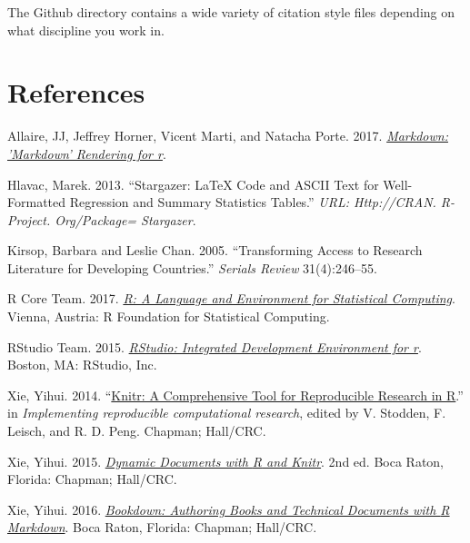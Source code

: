 \documentclass[
  12pt,
]{article}
\newlength{\cslhangindent}
\newlength{\cslentryspacingunit} %
\newenvironment{CSLReferences}[2] %
 {%
  \setlength{\parindent}{0pt}
  \ifodd #1
  \let\oldpar\par
  \def\par{\hangindent=\cslhangindent\oldpar}
  \fi
  \setlength{\parskip}{#2\cslentryspacingunit}
 }%
 {}
\begin{document}
The Github directory contains a wide variety of citation style files depending on what discipline you work in.

\hypertarget{references}{%
\section{References}\label{references}}

\linespread{1}

\hypertarget{refs}{}
\begin{CSLReferences}{1}{0}
\leavevmode{}%
Allaire, JJ, Jeffrey Horner, Vicent Marti, and Natacha Porte. 2017. \emph{\href{https://CRAN.R-project.org/package=markdown}{Markdown: 'Markdown' Rendering for r}}.

\leavevmode{}%
Hlavac, Marek. 2013. {``Stargazer: LaTeX Code and ASCII Text for Well-Formatted Regression and Summary Statistics Tables.''} \emph{URL: Http://CRAN. R-Project. Org/Package= Stargazer}.

\leavevmode{}%
Kirsop, Barbara and Leslie Chan. 2005. {``Transforming Access to Research Literature for Developing Countries.''} \emph{Serials Review} 31(4):246--55.

\leavevmode{}%
R Core Team. 2017. \emph{\href{https://www.R-project.org/}{R: A Language and Environment for Statistical Computing}}. Vienna, Austria: R Foundation for Statistical Computing.

\leavevmode{}%
RStudio Team. 2015. \emph{\href{http://www.rstudio.com/}{RStudio: Integrated Development Environment for r}}. Boston, MA: RStudio, Inc.

\leavevmode{}%
Xie, Yihui. 2014. {``\href{http://www.crcpress.com/product/isbn/9781466561595}{Knitr: A Comprehensive Tool for Reproducible Research in {R}}.''} in \emph{Implementing reproducible computational research}, edited by V. Stodden, F. Leisch, and R. D. Peng. Chapman; Hall/CRC.

\leavevmode{}%
Xie, Yihui. 2015. \emph{\href{https://yihui.name/knitr/}{Dynamic Documents with {R} and Knitr}}. 2nd ed. Boca Raton, Florida: Chapman; Hall/CRC.

\leavevmode{}%
Xie, Yihui. 2016. \emph{\href{https://github.com/rstudio/bookdown}{Bookdown: Authoring Books and Technical Documents with {R} Markdown}}. Boca Raton, Florida: Chapman; Hall/CRC.


\end{CSLReferences}
\end{document}
